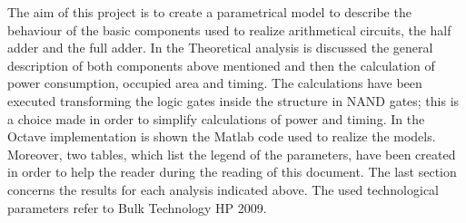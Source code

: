 The aim of this project is to create a parametrical model to describe the behaviour of the basic components used to realize arithmetical circuits, the half adder and the full adder. In the Theoretical analysis is discussed the general description of both components above mentioned and then the calculation of power consumption, occupied area and timing. The calculations have been executed transforming the logic gates inside the structure in NAND gates; this is a choice made in order to simplify calculations of power and timing. In the Octave implementation is shown the Matlab code used to realize the models. Moreover, two tables, which list the legend of the parameters, have been created in order to help the reader during the reading of this document. The last section concerns the results for each analysis indicated above. The used technological parameters refer to Bulk Technology HP 2009.
